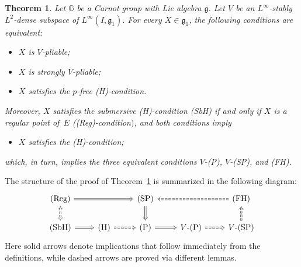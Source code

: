 \documentclass[pdftex]{sigma}
\numberwithin{equation}{section}
\newtheorem{Theorem}{Theorem}[section]
\theoremstyle{definition}
\begin{document}
\begin{Theorem}\label{thm:strong_main}
 Let $\mathbb{G}$ be a Carnot group with Lie algebra ${\mathfrak g}$. Let $V$ be an
 $L^\infty$-stably $L^2$-dense subspace of $L^\infty(I,{\mathfrak g}_1)$.
 For every $X\in {\mathfrak g}_1$, the following conditions are equivalent:
 \begin{itemize}\itemsep=0pt\setlength{\leftskip}{0.5cm}
 \item[$V$-{\rm (P)}] $X$ is $V$-pliable;
 \item[$V$-{\rm (SP)}] $X$ is strongly $V$-pliable;
 \item[{\rm (FH)}] $X$ satisfies the $p$-free {\rm (H)}-condition.
 \end{itemize}
Moreover, $X$ satisfies the submersive {\rm (H)}-condition {\rm (SbH)} if and only if $X$ is a regular point of~$E$ {\rm ((Reg)}-condition$)$, and both conditions imply
\begin{itemize}\itemsep=0pt\setlength{\leftskip}{0.45cm}
\item[{\rm (H)}] $X$ satisfies the {\rm (H)}-condition;
\end{itemize}
which, in turn, implies the three equivalent conditions $V$-{\rm (P)}, $V$-{\rm (SP)}, and {\rm (FH)}.
\end{Theorem}

The structure of the proof of Theorem~\ref{thm:strong_main} is summarized
 in the following
 diagram:
\[
\begin{tikzcd}
 \text{(Reg)} \arrow[rr,Rightarrow] \arrow[d,dashed,Leftrightarrow]&&\mbox{(SP)}\arrow[d,Rightarrow]
 &&\mbox{(FH)}\arrow[ll,dashed,Rightarrow]
 \\
 \mbox{(SbH)}\arrow[r,Rightarrow]& \mbox{(H)} \arrow[r,dashed,Rightarrow]&\mbox{(P)}\arrow[r,Rightarrow]&V\mbox{-(P)}
 \arrow[r, dashed, Rightarrow]&V\mbox{-(SP)}
 \arrow[u,dashed,Rightarrow]
 \end{tikzcd}
\]
Here solid arrows denote implications that
 follow immediately from
the definitions, while dashed arrows are proved
via different lemmas.
\end{document}

